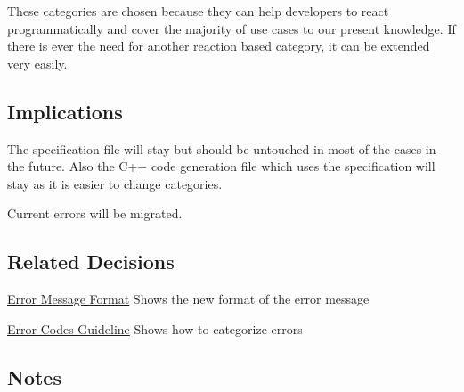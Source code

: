 These categories are chosen because they can help developers to react programmatically and cover the majority of use cases to our present knowledge. If there is ever the need for another reaction based category, it can be extended very easily.

\subsection*{Implications}

The specification file will stay but should be untouched in most of the cases in the future. Also the C++ code generation file which uses the specification will stay as it is easier to change categories.

Current errors will be migrated.

\subsection*{Related Decisions}


\begin{DoxyItemize}
\item \hyperlink{doc_decisions_error_message_format_md}{Error Message Format} Shows the new format of the error message
\item \hyperlink{doc_dev_error-categorization_md}{Error Codes Guideline} Shows how to categorize errors
\end{DoxyItemize}

\subsection*{Notes}